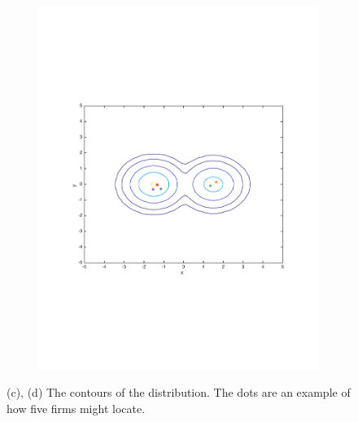 \documentclass[preprint, 12pt]{elsarticle}
\begin{document}
\begin{figure}[htp!]
\begin{subfigure}[t]{0.45\textwidth}
		\includegraphics[width=\textwidth, trim={15mm 75mm 20mm 75mm}]{Graphics/contour_mu15_nratio2.pdf}
		\caption[.]{}
		\label{fig:contour_mu15}
	\end{subfigure}
	\caption*{(c), (d) The contours of the distribution. The dots are an example of how five firms might locate.}
	

\end{figure}
\end{document}

